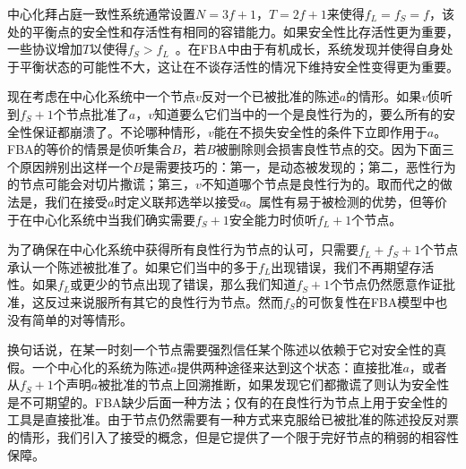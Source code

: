 中心化拜占庭一致性系统通常设置$N=3f+1$，$T=2f+1$来使得$f_L=f_S=f$，该处的平衡点的安全性和存活性有相同的容错能力。如果安全性比存活性更为重要，一些协议增加$T$以使得$f_S>f_L$~\cite{Li:2007:BOF:1973430.1973440}。在FBA中由于{\quorum}有机成长，系统发现并使得自身处于平衡状态的可能性不大，这让在不谈存活性的情况下维持安全性变得更为重要。

现在考虑在中心化系统中一个节点$v$反对一个已被批准的陈述$a$的情形。如果$v$侦听到$f_S+1$个节点批准了$a$，$v$知道要么它们当中的一个是良性行为的，要么所有的安全性保证都崩溃了。不论哪种情形，$v$能在不损失安全性的条件下立即作用于$a$。FBA的等价的情景是侦听集合$B$，若$B$被删除则会损害良性节点的{\quorum}交。因为下面三个原因辨别出这样一个$B$是需要技巧的：第一，{\quorum}是动态被发现的；第二，恶性行为的节点可能会对切片撒谎；第三，$v$不知道哪个节点是良性行为的。取而代之的做法是，我们在{\vblock}接受$a$时定义联邦选举以接受$a$。{\vblock}属性有易于被检测的优势，但等价于在中心化系统中当我们确实需要$f_S+1$安全能力时侦听$f_L+1$个节点。

为了确保在中心化系统中获得所有良性行为节点的认可，只需要$f_L+f_S+1$个节点承认一个陈述被批准了。如果它们当中的多于$f_L$出现错误，我们不再期望存活性。如果$f_L$或更少的节点出现了错误，那么我们知道$f_S+1$个节点仍然愿意作证批准，这反过来说服所有其它的良性行为节点。然而$f_S$的可恢复性在FBA模型中也没有简单的对等情形。

换句话说，在某一时刻一个节点需要强烈信任某个陈述以依赖于它对安全性的真假。一个中心化的系统为陈述$a$提供两种途径来达到这个状态：直接批准$a$，或者从$f_S+1$个声明$a$被批准的节点上回溯推断，如果发现它们都撒谎了则认为安全性是不可期望的。FBA缺少后面一种方法；仅有的在良性行为节点上用于安全性的工具是直接批准。由于节点仍然需要有一种方式来克服给已被批准的陈述投反对票的情形，我们引入了接受的概念，但是它提供了一个限于完好节点的稍弱的相容性保障。
